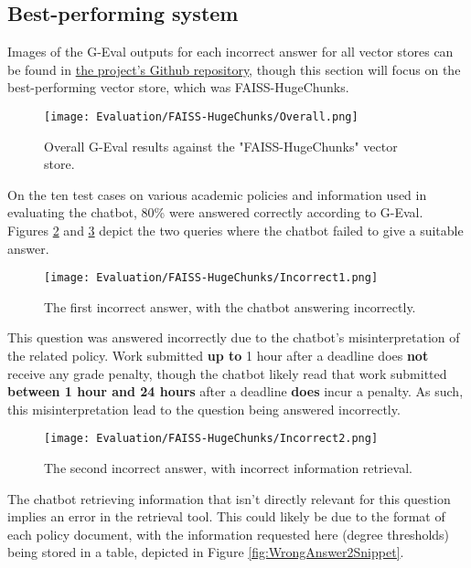 \subsection{Best-performing system}
\para Images of the G-Eval outputs for each incorrect answer for all vector stores can be found in \href{https://github.com/LewGoesB00M/CMP6200/tree/main/LaTeX/.images/Evaluation}{the project's Github repository}, though this section will focus on the best-performing vector store, which was 
FAISS-HugeChunks.

\begin{figure}[H]
    \centering
    \texttt{[image: Evaluation/FAISS-HugeChunks/Overall.png]}
    \caption{Overall G-Eval results against the "FAISS-HugeChunks" vector store. \label{fig:EvalResults}}
\end{figure}

\noindent On the ten test cases on various academic policies and information used in evaluating the chatbot,
80\% were answered correctly according to G-Eval. Figures \ref{fig:WrongAnswer1} and \ref{fig:WrongAnswer2} depict 
the two queries where the chatbot failed to give a suitable answer.

\begin{figure}[H]
    \centering
    \texttt{[image: Evaluation/FAISS-HugeChunks/Incorrect1.png]}
    \caption{The first incorrect answer, with the chatbot answering incorrectly. \label{fig:WrongAnswer1}}
\end{figure}

\noindent This question was answered incorrectly due to the chatbot's misinterpretation of the related policy. Work submitted \textbf{up to} 
1 hour after a deadline does \textbf{not} receive any grade penalty, though the chatbot likely read that work submitted \textbf{between 1 hour and 
24 hours} after a deadline \textbf{does} incur a penalty. As such, this misinterpretation lead to the question being answered incorrectly.

\begin{figure}[H]
    \centering
    \texttt{[image: Evaluation/FAISS-HugeChunks/Incorrect2.png]}
    \caption{The second incorrect answer, with incorrect information retrieval. \label{fig:WrongAnswer2}}
\end{figure}

\noindent The chatbot retrieving information that isn't directly relevant for this question implies an error in the retrieval tool. 
This could likely be due to the format of each policy document, with the information requested here (degree thresholds) being stored in
a table, depicted in Figure \ref{fig:WrongAnswer2Snippet}.

